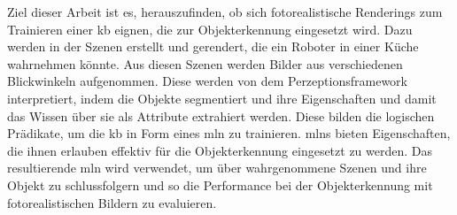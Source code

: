 Ziel dieser Arbeit ist es, herauszufinden, ob sich fotorealistische Renderings zum Trainieren einer \gls{kb} eignen, die zur Objekterkennung eingesetzt wird. Dazu werden in der \unreal Szenen erstellt und gerendert, die ein Roboter in einer Küche wahrnehmen könnte. Aus diesen Szenen werden Bilder aus verschiedenen Blickwinkeln aufgenommen. Diese werden von dem Perzeptionsframework \robosherlock interpretiert, indem die Objekte segmentiert und ihre Eigenschaften und damit das Wissen über sie als Attribute extrahiert werden. Diese bilden die logischen Prädikate, um die \gls{kb} in Form eines \gls{mln} zu trainieren. \glspl{mln} bieten Eigenschaften, die ihnen erlauben effektiv für die Objekterkennung eingesetzt zu werden. Das resultierende \gls{mln} wird verwendet, um über wahrgenommene Szenen und ihre Objekt zu schlussfolgern und so die Performance bei der Objekterkennung mit fotorealistischen Bildern zu evaluieren.       
